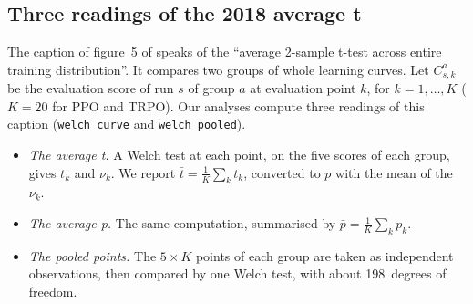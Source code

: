 \subsection{Three readings of the 2018 average t}\label{sec:t-moyen}
The caption of figure~5 of \textcite{henderson2018matters} speaks of the \enquote{average 2-sample t-test
across entire training distribution}. It compares two groups of whole learning curves. Let $C^a_{s,k}$ be the
evaluation score of run $s$ of group $a$ at evaluation point $k$, for $k=1,\dots,K$ ($K=20$ for PPO and TRPO).
Our analyses compute three readings of this caption (\texttt{welch\_curve} and \texttt{welch\_pooled}).
\begin{itemize}
  \item \emph{The average t.} A Welch test at each point, on the five scores of each group, gives $t_k$ and
    $\nu_k$. We report $\bar t = \frac1K\sum_k t_k$, converted to $p$ with the mean of the $\nu_k$.
  \item \emph{The average p.} The same computation, summarised by $\bar p = \frac1K\sum_k p_k$.
  \item \emph{The pooled points.} The $5\times K$ points of each group are taken as independent observations,
    then compared by one Welch test, with about 198~degrees of freedom.
\end{itemize}

